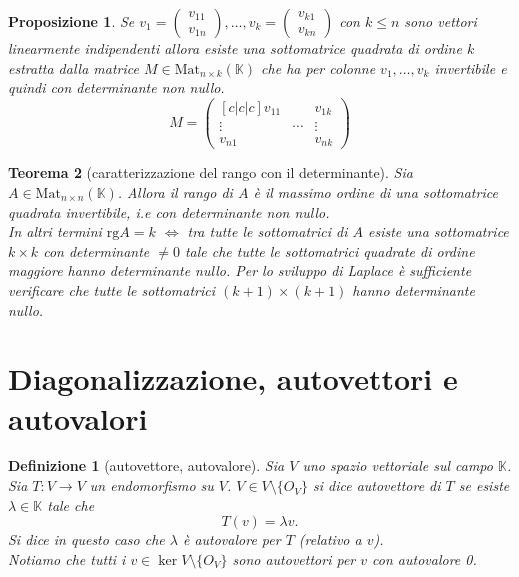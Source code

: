 \documentclass[9pt, a4paper]{article}
\newcommand{\K}{\mathbb{K}}
\newcommand{\letvs}{Sia $ V $ uno spazio vettoriale sul campo $ \K $}
\newcommand{\rg}{\mathrm{rg}}
\theoremstyle{mythm}
\newtheorem{definition}{Definizione}[section]
\newtheorem{thm}{Teorema}[section]
\newtheorem{prop}[thm]{Proposizione}
\begin{document}
\begin{prop}
	Se $ v_1 = \begin{pmatrix} v_{11} \\ v_{1n} \end{pmatrix}, \ldots, v_k = \begin{pmatrix} v_{k1} \\ v_{kn} \end{pmatrix} $ con $ k \leq n $ sono vettori linearmente \emph{indipendenti} allora esiste una sottomatrice quadrata di ordine $ k $ estratta dalla matrice $ M \in \mathrm{Mat}_{n \times k} (\K) $ che ha per colonne $ v_1, \ldots, v_k $ invertibile e quindi con determinante non nullo. 
	\[M = \begin{pmatrix}[c|c|c]
	v_{11} & & v_{1k} \\
	\vdots & \cdots & \vdots \\
	v_{n1} & & v_{nk}
	\end{pmatrix}\]
\end{prop}

\begin{thm}[caratterizzazione del rango con il determinante]
	Sia $ A \in \mathrm{Mat}_{n \times n} (\K) $. Allora il rango di $ A $ è il massimo ordine di una sottomatrice quadrata invertibile, i.e con determinante non nullo. \\
	In altri termini $ \rg A = k $ $ \iff $ tra tutte le sottomatrici di $ A $ esiste una sottomatrice $ k \times k $ con determinante $ \neq 0 $ tale che tutte le sottomatrici quadrate di ordine maggiore hanno determinante nullo. Per lo sviluppo di Laplace è sufficiente verificare che tutte le sottomatrici $ (k + 1) \times (k + 1) $ hanno determinante nullo. 
\end{thm}

\clearpage

\section{Diagonalizzazione, autovettori e autovalori}

\begin{definition}[autovettore, autovalore]
	\letvs. Sia $ T \colon V \to V $ un endomorfismo su $ V $. $ V \in V \setminus \{O_V\} $ si dice autovettore di $ T $ se esiste $ \lambda \in \K $ tale che \[T(v) = \lambda v.\] Si dice in questo caso che $ \lambda $ è autovalore per $ T $ (relativo a $ v $). \\
	Notiamo che tutti i $ v \in \ker V \setminus \{O_V\} $ sono autovettori per $ v $ con autovalore 0.  
\end{definition}
\end{document}

